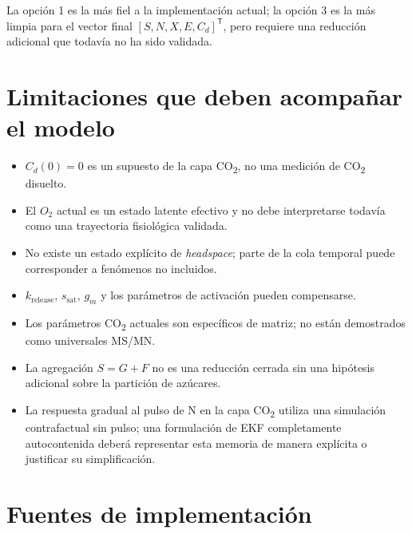 \documentclass[11pt,a4paper]{article}
\begin{document}
La opción 1 es la más fiel a la implementación actual; la opción 3 es la más limpia para el
vector final $[S,N,X,E,C_d]^\mathsf{T}$, pero requiere una reducción adicional que todavía no ha
sido validada.

\section{Limitaciones que deben acompañar el modelo}

\begin{itemize}
    \item $C_d(0)=0$ es un supuesto de la capa CO\textsubscript{2}, no una medición de CO\textsubscript{2} disuelto.
    \item El $O_2$ actual es un estado latente efectivo y no debe interpretarse todavía como una trayectoria fisiológica validada.
    \item No existe un estado explícito de \emph{headspace}; parte de la cola temporal puede corresponder a fenómenos no incluidos.
    \item $k_{\mathrm{release}}$, $s_{\mathrm{sat}}$, $g_m$ y los parámetros de activación pueden compensarse.
    \item Los parámetros CO\textsubscript{2} actuales son específicos de matriz; no están demostrados como universales MS/MN.
    \item La agregación $S=G+F$ no es una reducción cerrada sin una hipótesis adicional sobre la partición de azúcares.
    \item La respuesta gradual al pulso de N en la capa CO\textsubscript{2} utiliza una simulación contrafactual sin pulso; una formulación
    de EKF completamente autocontenida deberá representar esta memoria de manera explícita o justificar su simplificación.
\end{itemize}

\section{Fuentes de implementación}
\end{document}

